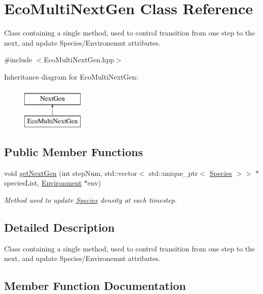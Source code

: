 \hypertarget{classEcoMultiNextGen}{}\section{Eco\+Multi\+Next\+Gen Class Reference}
\label{classEcoMultiNextGen}


Class containing a single method, used to control transition from one step to the next, and update Species/\+Environemnt attributes.  




{\ttfamily \#include $<$Eco\+Multi\+Next\+Gen.\+hpp$>$}

Inheritance diagram for Eco\+Multi\+Next\+Gen\+:\begin{figure}[H]
\begin{center}
\leavevmode
\includegraphics[height=2.000000cm]{classEcoMultiNextGen}
\end{center}
\end{figure}
\subsection*{Public Member Functions}
\begin{DoxyCompactItemize}
\item 
void \hyperlink{classEcoMultiNextGen_a956065141696cac390d8acb8ca5bcccb}{get\+Next\+Gen} (int step\+Num, std\+::vector$<$ std\+::unique\+\_\+ptr$<$ \hyperlink{classSpecies}{Species} $>$$>$ $\ast$species\+List, \hyperlink{classEnvironment}{Environment} $\ast$env)
\begin{DoxyCompactList}\small\item\em Method used to update \hyperlink{classSpecies}{Species} density at each timestep. \end{DoxyCompactList}\end{DoxyCompactItemize}


\subsection{Detailed Description}
Class containing a single method, used to control transition from one step to the next, and update Species/\+Environemnt attributes. 

\subsection{Member Function Documentation}
\hypertarget{classEcoMultiNextGen_a956065141696cac390d8acb8ca5bcccb}{}\label{classEcoMultiNextGen_a956065141696cac390d8acb8ca5bcccb} 
